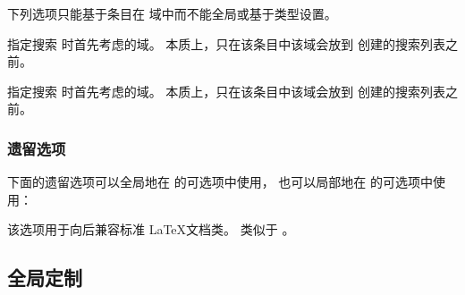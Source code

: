 下列选项只能基于条目在  域中而不能全局或基于类型设置。

\begin{optionlist}


指定搜索  时首先考虑的域。
本质上，只在该条目中该域会放到  创建的搜索列表之前。


指定搜索  时首先考虑的域。
本质上，只在该条目中该域会放到  创建的搜索列表之前。

\end{optionlist}

\subsubsection{遗留选项}

下面的遗留选项可以全局地在  的可选项中使用，
也可以局部地在  的可选项中使用：

\begin{optionlist}
	
\DeprecatedMark  %
该选项用于向后兼容标准 \LaTeX 文档类。
 类似于 。

\end{optionlist}

\subsection{全局定制}%
\label{use:cfg}

